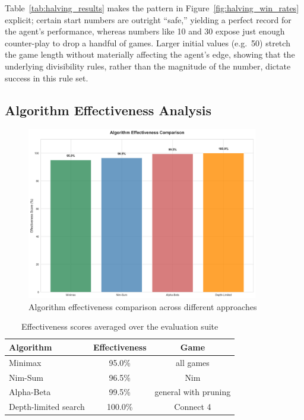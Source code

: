 \documentclass[12pt]{article}
\begin{document}
Table~\ref{tab:halving_results} makes the pattern in Figure~\ref{fig:halving_win_rates} explicit; certain start numbers are outright “safe,” yielding a perfect record for the agent's performance, whereas numbers like 10 and 30 expose just enough counter-play to drop a handful of games. Larger initial values (e.g.\ 50) stretch the game length without materially affecting the agent’s edge, showing that the underlying divisibility rules, rather than the magnitude of the number, dictate success in this rule set.

\subsection{Algorithm Effectiveness Analysis}

\begin{figure}[H]
    \centering
    \includegraphics[width=0.9\textwidth]{output/images/algorithm_effectiveness.png}
    \caption{Algorithm effectiveness comparison across different approaches}
    \label{fig:algorithm_effectiveness}
\end{figure}

\begin{table}[H]
    \centering
    \begin{tabular}{lcc}
        \toprule
        \textbf{Algorithm} & \textbf{Effectiveness} & \textbf{Game} \\
        \midrule
        Minimax & 95.0\% & all games \\
        Nim-Sum & 96.5\% & Nim \\
        Alpha-Beta & 99.5\% & general with pruning \\
        Depth-limited search & 100.0\% & Connect 4 \\
        \bottomrule
    \end{tabular}
    \caption{Effectiveness scores averaged over the evaluation suite}
    \label{tab:algorithm_effectiveness}
\end{table}
\end{document}
